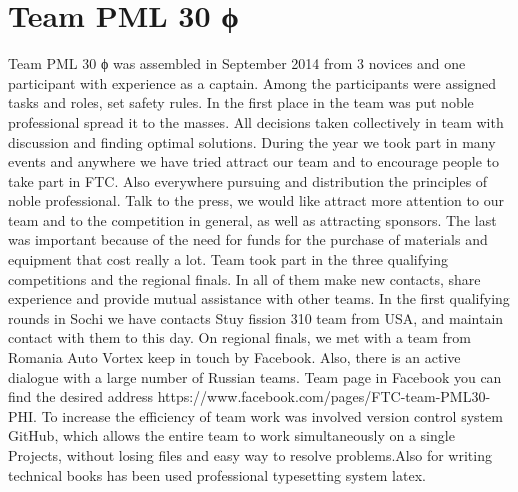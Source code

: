 
\section{Team PML 30 ϕ} 
		Team PML 30 ϕ was assembled in September 2014 from 3 novices and one participant with experience as a captain. Among the participants were assigned tasks and roles, set safety rules. In the first place in the team was put noble professional spread it to the masses.  All decisions taken collectively in team with discussion and finding optimal solutions. 
		During the year we took part in many events and anywhere we have tried attract our team and to encourage people to take part in FTC. Also everywhere pursuing and distribution the principles of noble professional. Talk to the press, we would like attract more attention to our team and to the competition in general, as well as attracting sponsors. The last was important because of the need for funds for the purchase of materials and equipment that cost really a lot.
		Team took part in the three qualifying competitions and the regional finals. In all of them make new contacts, share experience and provide mutual assistance with other teams. In the first qualifying rounds in Sochi we have contacts Stuy  fission 310 team from USA, and maintain contact with them to this day. On regional finals, we met with a team from Romania Auto Vortex keep in touch by Facebook. Also, there is an active dialogue with a large number of Russian teams. Team page in Facebook you can find the desired address https://www.facebook.com/pages/FTC-team-PML30-PHI.
	    To increase the efficiency of team work was involved version control system GitHub, which allows the entire team to work simultaneously on a single Projects, without losing files and easy way to resolve problems.Also for writing technical books has been used professional typesetting system latex.
	    \\
